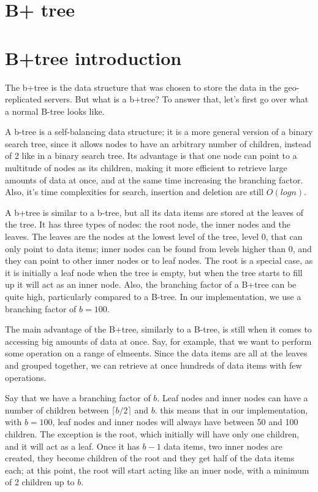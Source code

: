 \section{B+ tree}\label{sec:B+tree}

\section{B+tree introduction}\label{sec:b+tree-introduction}
The b+tree is the data structure that was chosen to store the data in the geo-replicated servers. 
But what is a b+tree? To answer that, let's first go over what a normal B-tree looks like. 

A b-tree is a self-balancing data structure; it is a more general version of a binary search tree, since it allows nodes to have an arbitrary number of children, instead of 2 like in a binary search tree. Its advantage is that one node can point to a multitude of nodes as its children, making it more efficient to retrieve large amounts of data at once, and at the same time increasing the branching factor. Also, it's time complexities for search, insertion and deletion are still $O(log n)$.

A b+tree is similar to a b-tree, but all its data items are stored at the leaves of the tree. It has three types of nodes: the root node, the inner nodes and the leaves. The leaves are the nodes at the lowest level of the tree, level 0, that can only point to data items; inner nodes can be found from levels higher than 0, and they can point to other inner nodes or to leaf nodes. The root is a special case, as it is initially a leaf node when the tree is empty, but when the tree starts to fill up it will act as an inner node. Also, the branching factor of a B+tree can be quite high, particularly compared to a B-tree. In our implementation, we use a branching factor of $b=100$.

The main advantage of the B+tree, similarly to a B-tree, is still when it comes to accessing big amounts of data at once. Say, for example, that we want to perform some operation on a range of elmeents. Since the data items are all at the leaves and grouped together, we can retrieve at once hundreds of data items with few operations. 

Say that we have a branching factor of $b$. Leaf nodes and inner nodes can have a number of children between $\lceil b/2 \rceil$ and $b$. this means that in our implementation, with $b=100$, leaf nodes and inner nodes will always have between 50 and 100 children. The exception is the root, which initially will have only one children, and it will act as a leaf. Once it has $b-1$ data items, two inner nodes are created, they become children of the root and they get half of the data items each; at this point, the root will start acting like an inner node, with a minimum of 2 children up to $b$.

